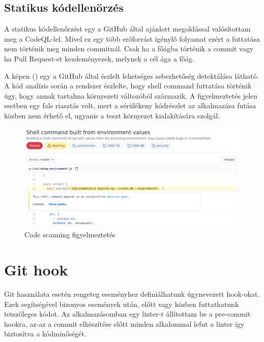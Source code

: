 \subsection{Statikus kódellenörzés}
A statikus kódellenőrzést egy a GitHub által ajánlott megoldással valósítottam meg a CodeQL-lel.
Mivel ez egy több erőforrást igénylő folyamat ezért a futtatása nem történik meg minden commitnál.
Csak ha a főágba történik a commit vagy ha Pull Request-et kezdeményezek, melynek a cél ága a főág.

A képen () egy a GitHub által észlelt lehetséges sebezhetőség detektálása látható.
A kód analízis során a rendszer észlelte, hogy shell command futtatása történik úgy, hogy annak tartalma környezeti változóból származik.
A figyelmeztetés jelen esetben egy fals riasztás volt, mert a sérülékeny kódrészlet az alkalmazása futása közben nem érhető el, ugyanis a teszt környezet kialakítására szolgál.

\begin{figure}[!ht]
  \centering
  \includegraphics[width=150mm, keepaspectratio]{figures/security.png}
  \caption{Code scanning figyelmeztetés}
  \label{fig:securityCheck}
\end{figure}

\section{Git hook}
Git használata esetén rengeteg eseményhez definiálhatunk úgynevezett hook-okat.
Ezek segítségével bizonyos események után, előtt vagy közben futtathatunk tetszőleges kódot.
Az alkalmazásomban egy linter-t állítottam be a pre-commit hookra, az-az a commit elkészítése előtt minden alkalommal lefut a linter így biztosítva a kódminőségét.

